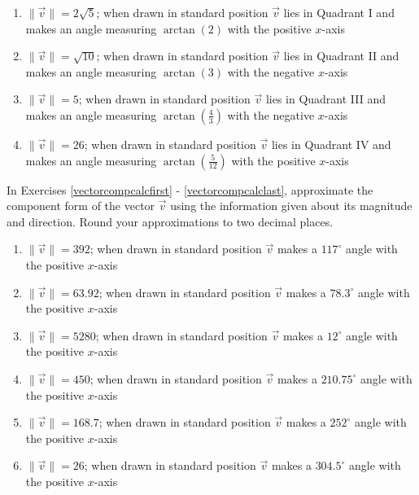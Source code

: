 \documentclass{ximera}
\begin{document}
\begin{enumerate}
\item $\| \vec{v}\| = 2\sqrt{5}$; when drawn in standard position $\vec{v}$ lies in Quadrant I and makes an angle measuring $\arctan(2)$ with the positive $x$-axis

\item $\| \vec{v}\| = \sqrt{10}$; when drawn in standard position $\vec{v}$ lies in Quadrant II and makes an angle measuring $\arctan(3)$ with the negative $x$-axis

\item $\| \vec{v}\| = 5$; when drawn in standard position $\vec{v}$ lies in Quadrant III and makes an angle measuring $\arctan\left(\frac{4}{3}\right)$ with the negative $x$-axis

\item $\| \vec{v}\| = 26$; when drawn in standard position $\vec{v}$ lies in Quadrant IV and makes an angle measuring $\arctan\left(\frac{5}{12}\right)$ with the positive $x$-axis \label{vectorcomplast}

\setcounter{HW}{\value{enumi}}

\end{enumerate}

In Exercises \ref{vectorcompcalcfirst} - \ref{vectorcompcalclast}, approximate the component form of the vector $\vec{v}$ using the information given about its magnitude and direction.  Round your approximations to two decimal places.

\begin{enumerate}

\setcounter{enumi}{\value{HW}}

\item $\|\vec{v}\| = 392$; when drawn in standard position $\vec{v}$ makes a $117^{\circ}$ angle with the positive $x$-axis \label{vectorcompcalcfirst}

\item $\|\vec{v}\| = 63.92$; when drawn in standard position $\vec{v}$ makes a $78.3^{\circ}$ angle with the positive $x$-axis

\item $\|\vec{v}\| = 5280$; when drawn in standard position $\vec{v}$ makes a $12^{\circ}$ angle with the positive $x$-axis 

\item $\|\vec{v}\| = 450$; when drawn in standard position $\vec{v}$ makes a $210.75^{\circ}$ angle with the positive $x$-axis 

\item $\|\vec{v}\| = 168.7$; when drawn in standard position $\vec{v}$ makes a $252^{\circ}$ angle with the positive $x$-axis

\item $\| \vec{v}\| = 26$; when drawn in standard position $\vec{v}$ makes a $304.5^{\circ}$ angle with the positive $x$-axis \label{vectorcompcalclast}

\setcounter{HW}{\value{enumi}}

\end{enumerate}
\end{document}

